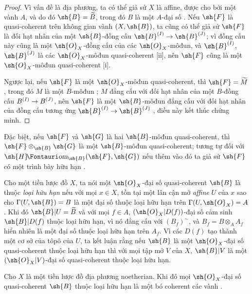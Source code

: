\documentclass[oneside]{amsart}
\makeatletter
\newcommand{\ega@arrow}[2]{\mathchoice{#1}{#2}{#2}{#2}}
\renewcommand{\to}{\ega@arrow{\longrightarrow}{\rightarrow}}
\newcommand*{\ega@sheafop}[3]{\sh{#1}#2\textup{\kern-2.2pt{\Fontauri\slshape #3}}}
\newcommand*{\shHom}{\ega@sheafop{H}{}{om}}
\let\EGAOriginalLabel\label
\renewcommand{\label}[1]{\phantomsection\EGAOriginalLabel{#1}}
\makeatother
\begin{document}
\begin{proof}
Vì vấn đề là địa phương, ta có thể giả sử $X$ là affine, được cho bởi một vành $A$, và do đó $\sh{B}=\widetilde{B}$, trong đó $B$ là một $A$-đại số .
Nếu $\sh{F}$ là quasi-coherent trên không gian vành $(X,\sh{B})$, ta cũng có thể giả sử $\sh{F}$ là đối hạt nhân của một $\sh{B}$-đồng cấu $\sh{B}^{(I)}\to\sh{B}^{(J)}$; vì đồng cấu này cũng là một $\sh{O}_X$-đồng cấu của các $\sh{O}_X$-môđun, và $\sh{B}^{(I)}$, $\sh{B}^{(J)}$ là các $\sh{O}_X$-môđun quasi-coherent [ii], nên $\sh{F}$ cũng là một $\sh{O}_X$-môđun quasi-coherent [i].

Ngược lại, nếu $\sh{F}$ là một $\sh{O}_X$-môđun quasi-coherent, thì $\sh{F}=\widetilde{M}$, trong đó $M$ là một $B$-môđun ; $M$ đẳng cấu với đối hạt nhân của một $B$-đồng cấu $B^{(I)}\to B^{(J)}$, nên $\sh{F}$ là một $\sh{B}$-môđun đẳng cấu với đối hạt nhân của đồng cấu tương ứng $\sh{B}^{(I)}\to\sh{B}^{(J)}$ , điều này kết thúc chứng minh.
\end{proof}

Đặc biệt, nếu $\sh{F}$ và $\sh{G}$ là hai $\sh{B}$-môđun quasi-coherent, thì $\sh{F}\otimes_{\sh{B}}\sh{G}$ là một $\sh{B}$-môđun quasi-coherent; tương tự đối với $\shHom_{\sh{B}}(\sh{F},\sh{G})$ nếu thêm vào đó ta giả sử $\sh{F}$ có một trình bày hữu hạn .

\begin{env}[9.6.2]
\label{I.9.6.2}
Cho một tiền lược đồ $X$, ta nói một $\sh{O}_X$-đại số quasi-coherent $\sh{B}$ là thuộc \emph{loại hữu hạn} nếu với mọi $x\in X$, tồn tại một lân cận mở \emph{affine} $U$ của $x$ sao cho $\Gamma(U,\sh{B})=B$ là một đại số thuộc loại hữu hạn trên $\Gamma(U,\sh{O}_X)=A$.
Khi đó $\sh{B}|U=\widetilde{B}$ và với mọi $f\in A$, $(\sh{O}_X|D(f))$-đại số cảm sinh $\sh{B}|D(f)$ thuộc loại hữu hạn, vì nó đẳng cấu với $(B_f)^{\sim}$, và $B_f=B\otimes_A A_f$ hiển nhiên là một đại số thuộc loại hữu hạn trên $A_f$.
Vì các $D(f)$ tạo thành một cơ sở của tôpô của $U$, ta kết luận rằng nếu $\sh{B}$ là một $\sh{O}_X$-đại số quasi-coherent thuộc loại hữu hạn thì với mọi tập mở $V$ của $X$, $\sh{B}|V$ là một $(\sh{O}_X|V)$-đại số quasi-coherent thuộc loại hữu hạn.
\end{env}

\begin{proposition}[9.6.3]
\label{I.9.6.3}
Cho $X$ là một tiền lược đồ địa phương noetherian.
Khi đó mọi $\sh{O}_X$-đại số quasi-coherent $\sh{B}$ thuộc loại hữu hạn là một bó coherent các vành .
\end{proposition}
\end{document}
